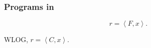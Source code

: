 \begin{frame}

\frametitle{Programs in \D{}}

\begin{center}

$$r=\left\langle F, x \right\rangle.$$

WLOG, $r=\left\langle C,x \right\rangle$.

\end{center}

\end{frame}
